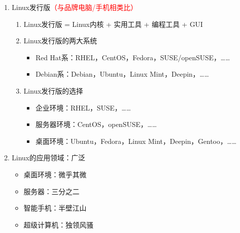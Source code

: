 \documentclass{TIJMUjiaoanLL}
\begin{document}
\begin{enumerate}
\begin{enumerate}
\begin{enumerate}
\begin{itemize}
	    \end{itemize}
	\end{enumerate}
\item Linux发行版\textcolor{red}{（与品牌电脑/手机相类比）}
	\begin{enumerate}
	  \item Linux发行版 = Linux内核 + 实用工具 + 编程工具 + GUI
	  \item Linux发行版的两大系统
	    \begin{itemize}
	      \item Red Hat系：RHEL，CentOS，Fedora，SUSE/openSUSE，……
	      \item Debian系：Debian，Ubuntu，Linux Mint，Deepin，……
	    \end{itemize}
	  \item Linux发行版的选择
	    \begin{itemize}
	      \item 企业环境：RHEL，SUSE，……
	      \item 服务器环境：CentOS，openSUSE，……
	      \item 桌面环境：Ubuntu，Fedora，Linux Mint，Deepin，Gentoo，……
	    \end{itemize}
	\end{enumerate}
      \item Linux的应用领域：广泛
	\begin{itemize}
	  \item 桌面环境：微乎其微
	  \item 服务器：三分之二
	  \item 智能手机：半壁江山
	  \item 超级计算机：独领风骚
	\end{itemize}
    \end{enumerate}

\otherTail
\newpage
\otherHeader


\end{enumerate}
\end{document}
